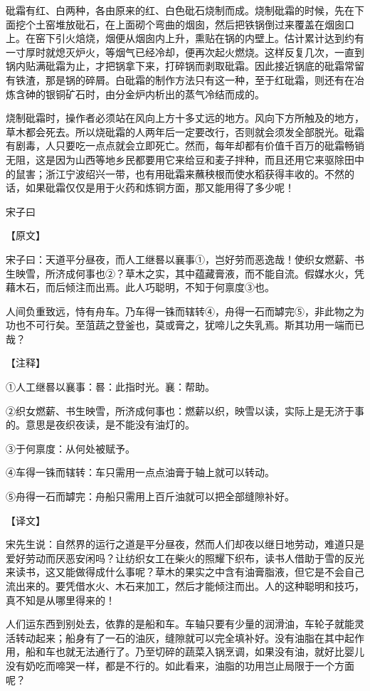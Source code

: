 \documentclass[12pt,UTF8]{ctexbook}
\begin{document}
砒霜有红、白两种，各由原来的红、白色砒石烧制而成。烧制砒霜的时候，先在下面挖个土窑堆放砒石，在上面砌个弯曲的烟囱，然后把铁锅倒过来覆盖在烟囱口上。在窑下引火焙烧，烟便从烟囱内上升，熏贴在锅的内壁上。估计累计达到约有一寸厚时就熄灭炉火，等烟气已经冷却，便再次起火燃烧。这样反复几次，一直到锅内贴满砒霜为止，才把锅拿下来，打碎锅而剥取砒霜。因此接近锅底的砒霜常留有铁渣，那是锅的碎屑。白砒霜的制作方法只有这一种，至于红砒霜，则还有在冶炼含砷的银铜矿石时，由分金炉内析出的蒸气冷结而成的。

烧制砒霜时，操作者必须站在风向上方十多丈远的地方。风向下方所触及的地方，草木都会死去。所以烧砒霜的人两年后一定要改行，否则就会须发全部脱光。砒霜有剧毒，人只要吃一点点就会立即死亡。然而，每年却都有价值千百万的砒霜畅销无阻，这是因为山西等地乡民都要用它来给豆和麦子拌种，而且还用它来驱除田中的鼠害；浙江宁波绍兴一带，也有用砒霜来蘸秧根而使水稻获得丰收的。不然的话，如果砒霜仅仅是用于火药和炼铜方面，那又能用得了多少呢！

宋子曰

【原文】

宋子曰：天道平分昼夜，而人工继晷以襄事①，岂好劳而恶逸哉！使织女燃薪、书生映雪，所济成何事也②？草木之实，其中蕴藏膏液，而不能自流。假媒水火，凭藉木石，而后倾注而出焉。此人巧聪明，不知于何禀度③也。

人间负重致远，恃有舟车。乃车得一铢而辖转④，舟得一石而罅完⑤，非此物之为功也不可行矣。至菹蔬之登釜也，莫或膏之，犹啼儿之失乳焉。斯其功用一端而已哉？

【注释】

①人工继晷以襄事：晷：此指时光。襄：帮助。

②织女燃薪、书生映雪，所济成何事也：燃薪以织，映雪以读，实际上是无济于事的。意思是夜织夜读，是不能没有油灯的。

③于何禀度：从何处被赋予。

④车得一铢而辖转：车只需用一点点油膏于轴上就可以转动。

⑤舟得一石而罅完：舟船只需用上百斤油就可以把全部缝隙补好。

【译文】

宋先生说：自然界的运行之道是平分昼夜，然而人们却夜以继日地劳动，难道只是爱好劳动而厌恶安闲吗？让纺织女工在柴火的照耀下织布，读书人借助于雪的反光来读书，这又能做得成什么事呢？草木的果实之中含有油膏脂液，但它是不会自己流出来的。要凭借水火、木石来加工，然后才能倾注而出。人的这种聪明和技巧，真不知是从哪里得来的！

人们运东西到别处去，依靠的是船和车。车轴只要有少量的润滑油，车轮子就能灵活转动起来；船身有了一石的油灰，缝隙就可以完全填补好。没有油脂在其中起作用，船和车也就无法通行了。乃至切碎的蔬菜入锅烹调，如果没有油，就好比婴儿没有奶吃而啼哭一样，都是不行的。如此看来，油脂的功用岂止局限于一个方面呢？
\end{document}

